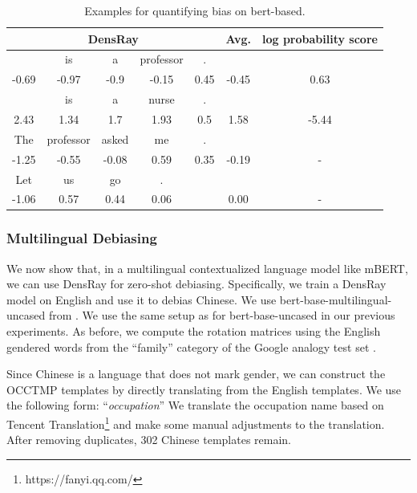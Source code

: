 \begin{table}[h]
	\centering
	\scriptsize
	\begin{tabular}{ccccccc}
		\hline
		\multicolumn{5}{c}{DensRay}&Avg.&log probability score\\		
		\hline
		[MASK] &is &a &professor& . &&\\
		-0.69 &-0.97 &-0.9  &-0.15  &0.45& -0.45& 0.63\\
		\hline
		[MASK] &is &a &nurse& . &&\\
		2.43  &1.34  &1.7   &1.93  &0.5& 1.58 &-5.44\\
		\hline
		The &professor &asked &me& . &&\\
		-1.25 &-0.55 &-0.08  &0.59  &0.35 &-0.19 &-\\
		\hline
		Let &us &go &.& &&\\
		-1.06  &0.57  &0.44  &0.06& &0.00 &-\\
		\hline
	\end{tabular}
	\caption{
		Examples for quantifying bias on bert-based.}
\end{table}

\subsubsection{Multilingual Debiasing}
We now show that, in a multilingual contextualized language
model like mBERT,
we can use DensRay  for zero-shot debiasing.
Specifically, we train a DensRay model on English and use it
to debias Chinese.
We use  bert-base-multilingual-uncased from
. We use the same setup as
for bert-base-uncased in our previous experiments. 
As before, we compute the rotation matrices using the English gendered words from the ``family'' category of the Google analogy test set .

Since Chinese is a language that does not mark gender, we
can construct the OCCTMP templates by directly translating
from the English templates. We use the following form:
``\text{[MASK]}\textit{occupation}''
We translate the occupation name based on
Tencent
Translation\footnote{https://fanyi.qq.com/} and make some
manual adjustments to the translation. After removing 
duplicates,  302 Chinese templates remain.

